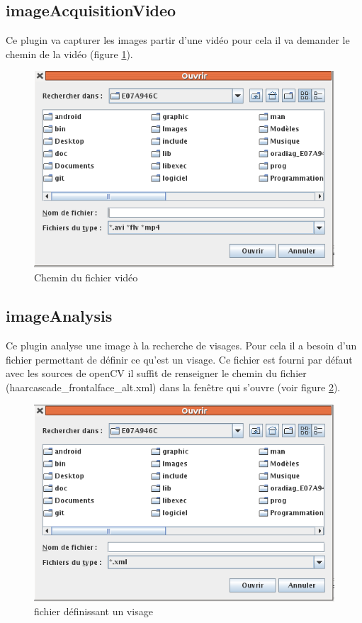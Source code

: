 \documentclass[a4paper , 12pt]{article}
\begin{document}
\subsection{imageAcquisitionVideo}
Ce plugin va capturer les images partir d'une vidéo pour cela il va demander le chemin de la vidéo (figure \ref{fig:fichier_video}).
\begin{figure}
\includegraphics[scale=0.4]{images/fichier_video.png}
\caption{Chemin du fichier vidéo}
\label{fig:fichier_video}
\end{figure}
\subsection{imageAnalysis}
Ce plugin analyse une image à la recherche de visages. Pour cela il a besoin d'un fichier permettant de définir ce qu'est un visage. Ce fichier est fourni par défaut avec les sources de openCV il suffit de renseigner le chemin du fichier (haarcascade\_frontalface\_alt.xml) dans la fenêtre qui s'ouvre (voir figure \ref{fig:haar}).

\begin{figure}
  \includegraphics[scale=0.5]{images/figureHaar.png}
  \caption{fichier définissant un visage}
  \label{fig:haar}
\end{figure}
\end{document}

